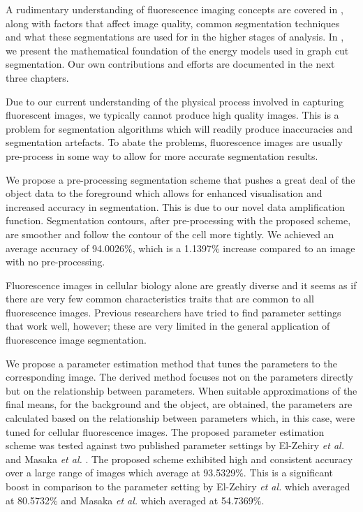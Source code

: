 
A rudimentary understanding of fluorescence imaging concepts are covered in , along with factors that affect image quality, common segmentation techniques and what these segmentations are used for in the higher stages of analysis.
In , we present the mathematical foundation of the energy models used in graph cut segmentation. Our own contributions and efforts are documented in the next three chapters.

\begin{definition}
	Due to our current understanding of the physical process involved in capturing fluorescent images, we typically cannot produce high quality images. This is a problem for segmentation algorithms which will readily produce inaccuracies and segmentation artefacts. To abate the problems, fluorescence images are usually pre-process in some way to allow for more accurate segmentation results.
	
	We propose a pre-processing segmentation scheme that pushes a great deal of the object data to the foreground which allows for enhanced visualisation and increased accuracy in segmentation. This is due to our novel data amplification function. Segmentation contours, after pre-processing with the proposed scheme, are smoother and follow the contour of the cell more tightly. We achieved an average accuracy of 94.0026\%, which is a 1.1397\% increase compared to an image with no pre-processing.
\end{definition}

\begin{definition}
	Fluorescence images in cellular biology alone are greatly diverse and it seems as if there are very few common characteristics traits that are common to all fluorescence images. Previous researchers have tried to find parameter settings that work well, however; these are very limited in the general application of fluorescence image segmentation.
	
	We propose a parameter estimation method that tunes the parameters to the corresponding image. The derived method focuses not on the parameters directly but on the relationship between parameters. When suitable approximations of the final means, for the background and the object, are obtained, the parameters are calculated based on the relationship between parameters which, in this case, were tuned for cellular fluorescence images.
	The proposed parameter estimation scheme was tested against two published parameter settings by El-Zehiry \textit{et al.} \citep{ElZehiry2007} and Masaka \textit{et al.} \citep{Maska2013}.
	The proposed scheme exhibited high and consistent accuracy over a large range of images which average at 93.5329\%. This is a significant boost in comparison to the parameter setting by El-Zehiry \textit{et al.} \citep{ElZehiry2007} which averaged at 80.5732\% and Masaka \textit{et al.} \citep{Maska2013} which averaged at 54.7369\%.
\end{definition}

